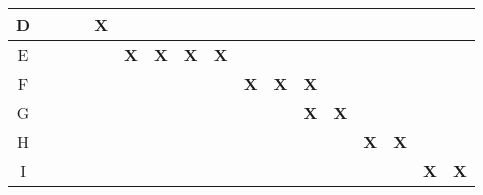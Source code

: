 \begin{table}[htb!]
\begin{tabular}{c|c|c|c|c|c|c|c|c|c|c|c|c|c|c|c|c|}
\multicolumn{1}{|c|}{D}               & {\bf }                & {\bf }                & {\bf }                & {\bf X}               & {\bf }                & {\bf }                & {\bf }                & {\bf }                & {\bf }                & {\bf }                & {\bf }          & {\bf }          & {\bf \it }      & {\bf \it }      & {\bf \it }      & {\bf \it }      \\ \hline
\multicolumn{1}{|c|}{E}               & {\bf }                & {\bf }                & {\bf }                & {\bf }                & {\bf X}               & {\bf X}               & {\bf X}               & {\bf X}               & {\bf }                & {\bf }                & {\bf }          & {\bf }          & {\bf \it }      & {\bf \it }      & {\bf \it }      & {\bf \it }      \\ \hline
\multicolumn{1}{|c|}{F}               & {\bf }                & {\bf }                & {\bf }                & {\bf }                & {\bf }                & {\bf }                & {\bf }                & {\bf }                & {\bf X}               & {\bf X}               & {\bf X}         & {\bf }          & {\bf \it }      & {\bf \it }      & {\bf \it }      & {\bf \it }      \\ \hline
\multicolumn{1}{|c|}{G}               &                       &                       &                       &                       &                       &                       &                       &                       &                       &                       & {\bf X}         & {\bf X}         & {\bf }          & {\bf }          & {\bf }          & {\bf }          \\ \hline
\multicolumn{1}{|c|}{H}               & \multicolumn{1}{l|}{} & \multicolumn{1}{l|}{} & \multicolumn{1}{l|}{} & \multicolumn{1}{l|}{} & \multicolumn{1}{l|}{} & \multicolumn{1}{l|}{} & \multicolumn{1}{l|}{} & \multicolumn{1}{l|}{} & \multicolumn{1}{l|}{} & \multicolumn{1}{l|}{} & {\bf }          & {\bf }          & {\bf X}         & {\bf X}         & {\bf }          & {\bf }          \\ \hline
\multicolumn{1}{|c|}{I}               & \multicolumn{1}{l|}{} & \multicolumn{1}{l|}{} & \multicolumn{1}{l|}{} & \multicolumn{1}{l|}{} & \multicolumn{1}{l|}{} & \multicolumn{1}{l|}{} & \multicolumn{1}{l|}{} & \multicolumn{1}{l|}{} & \multicolumn{1}{l|}{} & \multicolumn{1}{l|}{} & {\bf }          & {\bf }          & {\bf }          & {\bf }          & {\bf X}         & {\bf X}         \\ \hline
\end{tabular}
\end{table}

